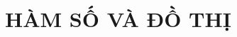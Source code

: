 \documentclass[12pt,a4paper,oneside]{book}
\theoremstyle{explain}
\theoremstyle{nonumberplain}
\begin{document}
	\tableofcontents
	\chapter{HÀM SỐ VÀ ĐỒ THỊ}
%		
%		
%		
		
%		
%		
%		
%		
%		
%		
%		
%		
\end{document}
